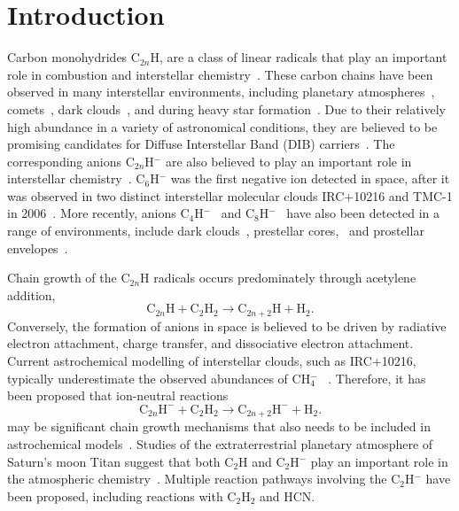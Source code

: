 \documentclass[aip,graphicx]{revtex4-1}
\begin{document}
\section{Introduction}
Carbon monohydrides C$_{2n}$H, are a class of linear radicals that play an important role in combustion and interstellar chemistry~\cite{kie90,kie92,bou96,wil91,vui01}. These carbon chains have been observed in many interstellar environments, including planetary atmospheres~\cite{vui01,wil03,dob16}, comets~\cite{jac96}, dark clouds~\cite{ziu82,gup09}, and during heavy star formation~\cite{beu08,jia15}. Due to their relatively high abundance in a variety of astronomical conditions, they are believed to be promising candidates for Diffuse Interstellar Band (DIB) carriers~\cite{dou77,ful93,wat94,ful00,sch05,gup09}. The corresponding anions C$_{2n}$H$^-$ are also believed to play an important role in interstellar chemistry~\cite{mil17,gup09}. C$_6$H$^-$ was the first negative ion detected in space, after it was observed in two distinct interstellar molecular clouds IRC+10216 and TMC-1 in 2006~\cite{mcc06}. More recently, anions C$_4$H$^-$~\cite{cer07} and C$_8$H$^-$~\cite{bru07,rem07} have also been detected in a range of environments, include dark clouds~\cite{cor13}, prestellar cores,~\cite{sak10} and prostellar envelopes~\cite{sak07}.

Chain growth of the C$_{2n}$H radicals occurs predominately through acetylene addition,~\cite{wil03}
\begin{equation}
\text{C}_{2n}\text{H} + \text{C}_2\text{H}_2 \rightarrow \text{C}_{2n+2}\text{H}+\text{H}_2.
\end{equation}
Conversely, the formation of anions in space is believed to be driven by radiative electron attachment, charge transfer, and dissociative electron attachment. Current astrochemical modelling of interstellar clouds, such as IRC+10216, typically underestimate the observed abundances of CH$_4^-$ ~\cite{mil17,cor13,her08}. Therefore, it has been proposed that ion-neutral reactions
\begin{equation}
\text{C}_{2n}\text{H}^- + \text{C}_2\text{H}_2 \rightarrow \text{C}_{2n+2}\text{H}^- + \text{H}_2.
\end{equation}
may be significant chain growth mechanisms that also needs to be included in astrochemical models~\cite{mil17,bas19}. Studies of the extraterrestrial planetary atmosphere of Saturn's moon Titan suggest that both C$_2$H and C$_2$H$^-$ play an important role in the atmospheric chemistry~\cite{dob16,vui09,des17,vri18}. Multiple reaction pathways involving the C$_2$H$^-$ have been proposed, including reactions with C$_2$H$_2$ and HCN. 
\end{document}
